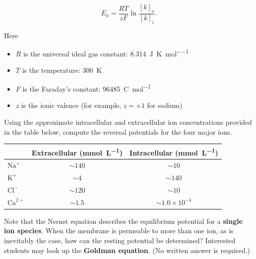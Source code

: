 \documentclass{article}
\begin{document}
\[
E_k=\dfrac{RT}{zF}\ln\dfrac{[k]_o}{[k]_i}.
\]

Here

\begin{itemize}
    \item $R$ is the universal ideal gas constant: \SI{8.314}{\joule\per\kelvin\per\mole}
    \item $T$ is the temperature: \SI{300}{\kelvin}
    \item $F$ is the Faraday's constant: \SI{96485}{\coulomb\per\mol}
    \item $z$ is the ionic valence (for example, $z=+1$ for sodium)
\end{itemize}

Using the approximate intracellular and extracellular ion concentrations provided in the table below, compute the reversal potentials for the four major ions.

\begin{table}[H]
    \centering
    \begin{tabular}{lcc}
      \toprule
      & Extracellular (\si{\milli\mole\per\liter}) & Intracellular (\si{\milli\mole\per\liter}) \\
      \midrule
      $\mathrm{Na}^+$     & $\sim 140$ & $\sim 10$\\
      $\mathrm{K}^+$      & $\sim 4$   & $\sim 140$\\
      $\mathrm{Cl}^-$     & $\sim 120$ & $\sim 10$ \\
      $\mathrm{Ca}^{2+}$  & $\sim 1.5$ & $\sim 1.0\times10^{-4}$\\
      \bottomrule
    \end{tabular}
  \end{table}


Note that the Nernst equation describes the equilibrium potential for a \textbf{single ion species}. 
When the membrane is permeable to more than one ion, as is inevitably the case, how can the resting potential be determined?
Interested students may look up the \textbf{Goldman equation}. (No written answer is required.)
\end{document}
